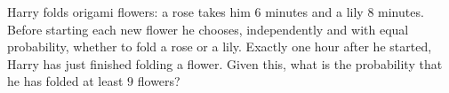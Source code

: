 Harry folds origami flowers: a rose takes him $6$ minutes and a lily $8$ minutes. Before starting each new flower he chooses, independently and with equal probability, whether to fold a rose or a lily. Exactly one hour after he started, Harry has just finished folding a flower. Given this, what is the probability that he has folded at least $9$ flowers?
